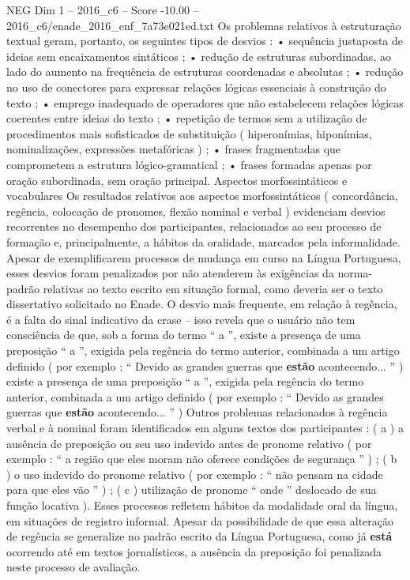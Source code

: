 \begin{textsample}{NEG Dim 1 – 2016\_c6 – Score -10.00 – 2016\_c6/enade\_2016\_enf\_7a73e021ed.txt}
Os problemas relativos à estruturação textual geram, portanto, os seguintes tipos de desvios : • sequência justaposta de ideias sem encaixamentos sintáticos ; • redução de estruturas subordinadas, ao lado do aumento na frequência de estruturas coordenadas e absolutas ; • redução no uso de conectores para expressar relações lógicas essenciais à construção do texto ; • emprego inadequado de operadores que não estabelecem relações lógicas coerentes entre ideias do texto ; • repetição de termos sem a utilização de procedimentos mais sofisticados de substituição ( hiperonímias, hiponímias, nominalizações, expressões metafóricas ) ; • frases fragmentadas que comprometem a estrutura lógico-gramatical ; • frases formadas apenas por oração subordinada, sem oração principal.
Aspectos morfossintáticos e vocabulares Os resultados relativos aos aspectos morfossintáticos ( concordância, regência, colocação de pronomes, flexão nominal e verbal ) evidenciam desvios recorrentes no desempenho dos participantes, relacionados ao seu processo de formação e, principalmente, a hábitos da oralidade, marcados pela informalidade.
Apesar de exemplificarem processos de mudança em curso na Língua Portuguesa, esses desvios foram penalizados por não atenderem às exigências da norma-padrão relativas ao texto escrito em situação formal, como deveria ser o texto dissertativo solicitado no Enade.
O desvio mais frequente, em relação à regência, é a falta do sinal indicativo da crase – isso revela que o usuário não tem consciência de que, sob a forma do termo “ a ”, existe a presença de uma preposição “ a ”, exigida pela regência do termo anterior, combinada a um artigo definido ( por exemplo : “ Devido as grandes guerras que \textbf{estão} acontecendo... ” ) existe a presença de uma preposição “ a ”, exigida pela regência do termo anterior, combinada a um artigo definido ( por exemplo : “ Devido as grandes guerras que \textbf{estão} acontecendo... ” ) Outros problemas relacionados à regência verbal e à nominal foram identificados em alguns textos dos participantes : ( a ) a ausência de preposição ou seu uso indevido antes de pronome relativo ( por exemplo : “ a região que eles moram não oferece condições de segurança ” ) ; ( b ) o uso indevido do pronome relativo ( por exemplo : “ não pensam na cidade para que eles vão ” ) ; ( c ) utilização de pronome “ onde ” deslocado de sua função locativa ).
Esses processos refletem hábitos da modalidade oral da língua, em situações de registro informal.
Apesar da possibilidade de que essa alteração de regência se generalize no padrão escrito da Língua Portuguesa, como já \textbf{está} ocorrendo até em textos jornalísticos, a ausência da preposição foi penalizada neste processo de avaliação.

\end{textsample}
